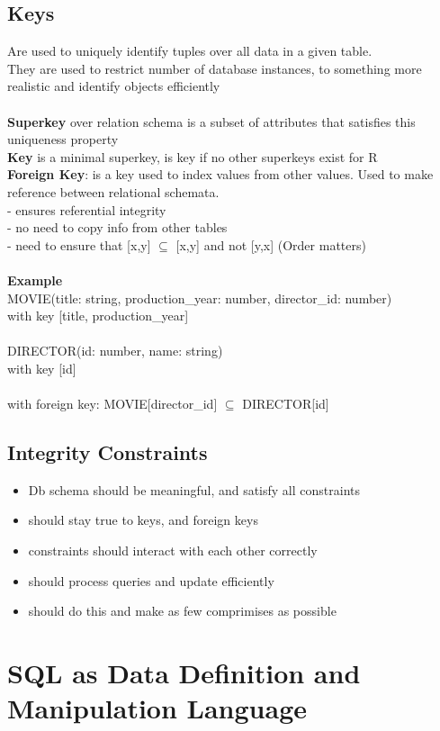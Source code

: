 \documentclass{article}
\newcommand\tab[1][0.5cm]{\hspace*{#1}}
\begin{document}
	\subsection{Keys}
		Are used to uniquely identify tuples over all data in a given table.
		\\ They are used to restrict number of database instances, to something more realistic and identify objects efficiently
		\\ \\ 
		\textbf{Superkey} over relation schema is a subset of attributes that satisfies this uniqueness property
		\\ \textbf{Key} is a minimal superkey, is key if no other superkeys exist for R
		\\ \textbf{Foreign Key}: is a key used to index values from other values. Used to make reference between relational schemata. 
		\\ \tab - ensures referential integrity
		\\ \tab - no need to copy info from other tables
		\\ \tab - need to ensure that [x,y] $\subseteq$ [x,y] and not [y,x] (Order matters)
		\\ \\ \textbf{Example}
		\\ MOVIE(title: string, production\_year: number, director\_id: number) 
		\\ with key [title, production\_year]
		\\ \\ DIRECTOR(id: number, name: string)
		\\ with key [id]
		\\ \\ with foreign key: MOVIE[director\_id] $\subseteq$ DIRECTOR[id]

	\subsection{Integrity Constraints}
		\begin{itemize}
			\item Db schema should be meaningful, and satisfy all constraints
			\item should stay true to keys, and foreign keys
			\item constraints should interact with each other correctly
			\item should process queries and update efficiently
			\item should do this and make as few comprimises as possible
		\end{itemize}

\section{SQL as Data Definition and Manipulation Language}
\end{document}
